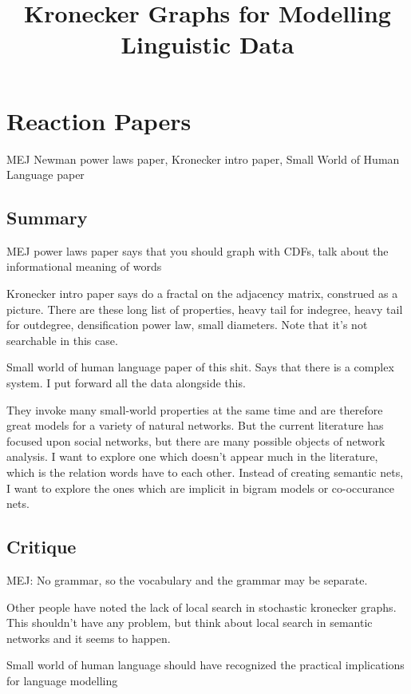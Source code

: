 \documentclass[12pt]{article}
\begin{document}
\title{Kronecker Graphs for Modelling Linguistic Data}

\section{Reaction Papers}

MEJ Newman power laws paper, Kronecker intro paper, Small World of Human Language paper

\subsection{Summary}
MEJ power laws paper says that you should graph with CDFs, talk about the informational meaning of words

Kronecker intro paper says do a fractal on the adjacency matrix, construed as a picture. There are these long list of properties, heavy tail for indegree, heavy tail for outdegree, densification power law, small diameters. Note that it's not searchable in this case.

Small world of human language paper of this shit. Says that there is a complex system. I put forward all the data alongside this.

They invoke many small-world properties at the same time and are therefore great models for a variety of natural networks. But the current literature has focused upon social networks, but there are many possible objects of network analysis. I want to explore one which doesn't appear much in the literature, which is the relation words have to each other. Instead of creating semantic nets, I want to explore the ones which are implicit in bigram models or co-occurance nets.

\subsection{Critique}
MEJ: No grammar, so the vocabulary and the grammar may be separate.

Other people have noted the lack of local search in stochastic kronecker graphs. This shouldn't have any problem, but think about local search in semantic networks and it seems to happen.

Small world of human language should have recognized the practical implications for language modelling
\end{document}
